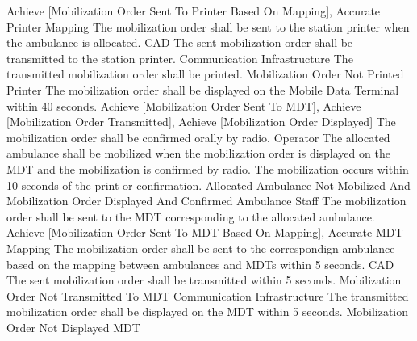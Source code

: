 	 {Achieve [Mobilization Order Sent To Printer Based On Mapping], Accurate Printer Mapping}
\stopkaosspec
\startkaosspec
	 {The mobilization order shall be sent to the station printer when the ambulance is allocated.}
	 {CAD}
\stopkaosspec
\startkaosspec
	 {The sent mobilization order shall be transmitted to the station printer.}
	 {Communication Infrastructure}
\stopkaosspec
\startkaosspec
	 {The transmitted mobilization order shall be printed.}
	 {Mobilization Order Not Printed}
	 {Printer}
\stopkaosspec
\startkaosspec
	 {The mobilization order shall be displayed on the Mobile Data Terminal within 40 seconds.}
	 {Achieve [Mobilization Order Sent To MDT], Achieve [Mobilization Order Transmitted], Achieve [Mobilization Order Displayed]}
\stopkaosspec
\startkaosspec
	 {The mobilization order shall be confirmed orally by radio.}
	 {Operator}
\stopkaosspec
\startkaosspec
	 {The allocated ambulance shall be mobilized when the mobilization order is displayed on the MDT and the mobilization is confirmed by radio. The mobilization occurs within 10 seconds of the print or confirmation.}
	 {Allocated Ambulance Not Mobilized And Mobilization Order Displayed And Confirmed}
	 {Ambulance Staff}
\stopkaosspec
\startkaosspec
	 {The mobilization order shall be sent to the MDT corresponding to the allocated ambulance.}
	 {Achieve [Mobilization Order Sent To MDT Based On Mapping], Accurate MDT Mapping}
\stopkaosspec
\startkaosspec
	 {The mobilization order shall be sent to the correspondign ambulance based on the mapping between ambulances and MDTs within 5 seconds.}
	 {CAD}
\stopkaosspec
\startkaosspec
	 {The sent mobilization order shall be transmitted within 5 seconds.}
	 {Mobilization Order Not Transmitted To MDT}
	 {Communication Infrastructure}
\stopkaosspec
\startkaosspec
	 {The transmitted mobilization order shall be displayed on the MDT within 5 seconds.}
	 {Mobilization Order Not Displayed}
	 {MDT}
\stopkaosspec
\startkaosspec
	 {}
\stopkaosspec


